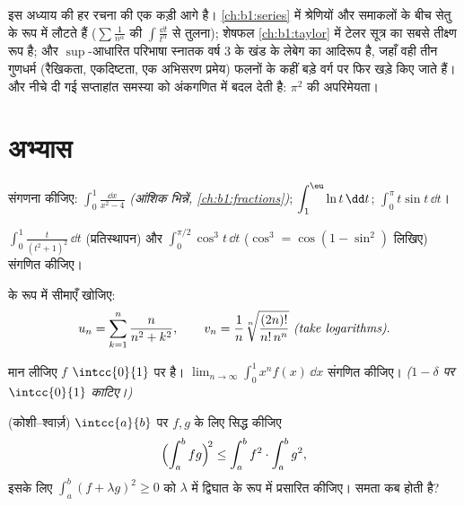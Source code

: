 \begin{remark}[समाकल आगे कहाँ काम करता है]
इस अध्याय की हर रचना की एक कड़ी आगे है।  \cref{ch:b1:series} में
श्रेणियों और समाकलों के बीच सेतु के रूप में लौटते हैं ($\sum
\frac{1}{n^\alpha}$ की $\int \frac{\dd t}{t^\alpha}$ से तुलना);  शेषफल
\cref{ch:b1:taylor} में टेलर सूत्र का सबसे तीक्ष्ण रूप है; और $\sup$-आधारित
परिभाषा स्नातक वर्ष 3 के खंड के लेबेग  का आदिरूप है, जहाँ वही तीन
गुणधर्म (रैखिकता, एकदिष्टता, एक अभिसरण प्रमेय) फलनों के कहीं बड़े वर्ग पर
फिर खड़े किए जाते हैं। और नीचे दी गई सप्ताहांत समस्या  को
अंकगणित में बदल देती है: $\pi^2$ की अपरिमेयता।
\end{remark}

\section{अभ्यास}

\begin{exercise}[$\star$]\label{exo:b1:integration:1}
संगणना कीजिए: $\displaystyle\int_0^1 \frac{\dd x}{x^2 - 4}$ \emph{(आंशिक
भिन्नें, \cref{ch:b1:fractions})}; $\displaystyle\int_1^{\eu} \ln t \,\dd
t$; $\displaystyle\int_0^{\pi} t \sin t\, \dd t$।
\end{exercise}

\begin{exercise}[$\star$]\label{exo:b1:integration:2}
$\displaystyle\int_0^{1} \frac{t}{(t^2+1)^2}\,\dd t$ (प्रतिस्थापन) और
$\displaystyle\int_0^{\pi/2} \cos^3 t\, \dd t$ ($\cos^3 = \cos(1 - \sin^2)$
लिखिए) संगणित कीजिए।
\end{exercise}

\begin{exercise}[$\star$]\label{exo:b1:integration:3}
 के रूप में सीमाएँ खोजिए:
\[
u_n = \sum_{k=1}^{n} \frac{n}{n^2 + k^2},
\qquad
v_n = \frac{1}{n}\sqrt[n]{\frac{(2n)!}{n!\,n^n}}
\ \emph{(take logarithms)}.
\]
\end{exercise}

\begin{exercise}[$\star$]\label{exo:b1:integration:4}
मान लीजिए $f$ $\intcc{0}{1}$ पर  है। $\lim_{n\to\infty} \int_0^1 x^n
f(x)\,\dd x$ संगणित कीजिए। \emph{($1 - \delta$ पर $\intcc{0}{1}$ काटिए।)}
\end{exercise}

\begin{exercise}[$\star\star$]\label{exo:b1:integration:5}
(कोशी--श्वार्ज़) $\intcc{a}{b}$ पर  $f, g$ के लिए सिद्ध कीजिए
\[
\Bigl(\int_a^b fg\Bigr)^{\!2} \leq \int_a^b f^2 \cdot \int_a^b g^2 ,
\]
इसके लिए $\int_a^b (f + \lambda g)^2 \geq 0$ को $\lambda$ में द्विघात के रूप
में प्रसारित कीजिए। समता कब होती है?
\end{exercise}


